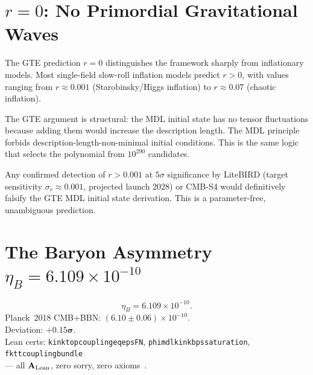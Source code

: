 \documentclass[11pt,a4paper]{article}
\newcommand{\lean}[1]{%
  \penalty-100
  \begingroup\def\_{\textunderscore\allowbreak}\texttt{#1}\endgroup}
\newcommand{\CatAL}{\ensuremath{\mathbf{A}_{\rm Lean}}}
\newcommand{\etaB}{\eta_B}
\begin{document}
\section{$r = 0$: No Primordial Gravitational Waves}
\label{sec:r}

The GTE prediction $r = 0$ distinguishes the framework sharply from
inflationary models.
Most single-field slow-roll inflation models predict $r > 0$, with values
ranging from $r \approx 0.001$ (Starobinsky/Higgs inflation) to $r \approx 0.07$
(chaotic inflation).

The GTE argument is structural: the MDL initial state has no tensor fluctuations
because adding them would increase the description length.
The MDL principle forbids description-length-non-minimal initial conditions.
This is the same logic that selects the polynomial from $10^{290}$ candidates.

\begin{tcolorbox}[colback=boxblue,colframe=blue!40!black,
  title={Falsification criterion}]
Any confirmed detection of $r > 0.001$ at $5\sigma$ significance by
LiteBIRD (target sensitivity $\sigma_r \approx 0.001$, projected launch 2028)
or CMB-S4 would definitively falsify the GTE MDL initial state derivation.
This is a parameter-free, unambiguous prediction.
\end{tcolorbox}

\section{The Baryon Asymmetry $\eta_B = 6.109 \times 10^{-10}$}
\label{sec:baryon}

\begin{tcolorbox}[colback=boxorange,colframe=orange!60!black,
  title={Result: Baryon Asymmetry via FKTT (\CatAL)}]
\[
  \etaB = 6.109 \times 10^{-10}.
\]
Planck~2018 CMB+BBN: $(6.10 \pm 0.06) \times 10^{-10}$.\\[2pt]
Deviation: $\mathbf{+0.15\sigma}$.\\[2pt]
Lean certs: \lean{kink\_top\_coupling\_eq\_eps\_FN},
\lean{phi\_mdl\_kink\_bps\_saturation}, \lean{fktt\_coupling\_bundle}\\[2pt]
--- all \CatAL, zero sorry, zero axioms~\cite{SpivackGTECompleteFramework}.
\end{tcolorbox}
\end{document}
